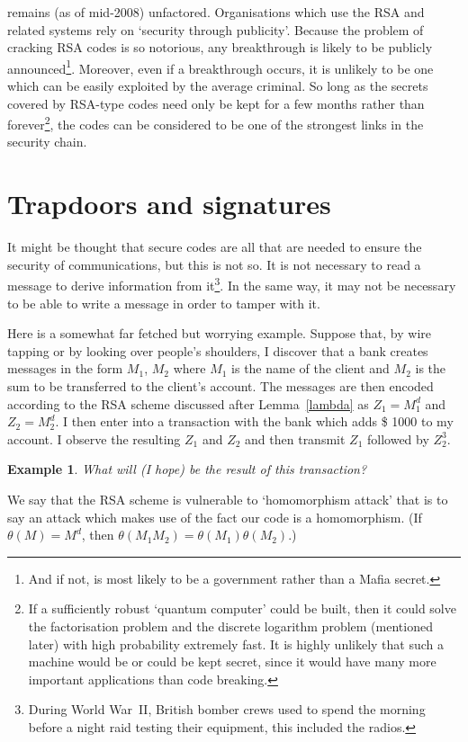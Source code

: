 \documentclass[12pt,a4paper]{article}
\theoremstyle{plain}
\newtheorem{example}[theorem]{Example}
\theoremstyle{definition}
\begin{document}
    remains (as of mid-2008) unfactored.
    Organisations which use the RSA and related systems
    rely on `security through publicity'. Because
    the problem of cracking RSA codes is so notorious,
    any breakthrough is likely to be publicly
    announced\footnote{And if not, is most likely
    to be a government rather than a Mafia secret.}.
    Moreover, even if a breakthrough occurs, it
    is unlikely to be one which can be easily
    exploited by the average criminal. So long
    as the secrets covered by RSA-type codes
    need only be kept for a few months rather
    than forever\footnote{If a sufficiently robust
    `quantum computer' could be built, then
    it could solve the factorisation problem
    and the discrete logarithm problem
    (mentioned later) with high probability
    extremely fast. It is highly unlikely
    that such a machine would be or could be
    kept secret, since it would have many more
    important applications than
    code breaking.}, the codes can be considered
    to be one of the strongest links in the
    security chain.
    \section{Trapdoors and signatures}\label{trapdoors}
    It might be thought that secure codes
    are all that are needed to ensure
    the security of communications,
    but this is not so. It is not necessary
    to read a message to derive information
    from it\footnote{During World War~II,
    British bomber crews used to spend the morning
    before a night raid testing their equipment,
    this included the radios.}. In the same way,
    it may not be necessary to be able to
    write a message in order to tamper with it.

    Here is a somewhat far fetched but worrying example.
    Suppose that, by wire tapping or by looking over
    people's shoulders, I discover that a bank
    creates messages in the form $M_{1}$, $M_{2}$
    where $M_{1}$ is the name of the client
    and $M_{2}$ is the sum to be transferred
    to the client's account.
    The messages are then encoded
    according to the RSA scheme discussed after Lemma~\ref{lambda}
    as $Z_{1}=M_{1}^{d}$ and $Z_{2}=M_{2}^{d}$. I then
    enter into a transaction with the bank
    which adds \$ 1000 to my account.
    I observe the resulting $Z_{1}$ and $Z_{2}$
    and then transmit $Z_{1}$ followed by $Z_{2}^{3}$.
    \begin{example}
        What will (I hope) be the result
        of this transaction?
    \end{example}
    \noindent
    We say that the RSA scheme is vulnerable to
    `homomorphism attack' that is to say an attack
    which makes use of the fact our code is a homomorphism.
    (If $\theta(M)=M^{d}$, then
    $\theta(M_{1}M_{2})=\theta(M_{1})\theta(M_{2})$.)
\end{document}
